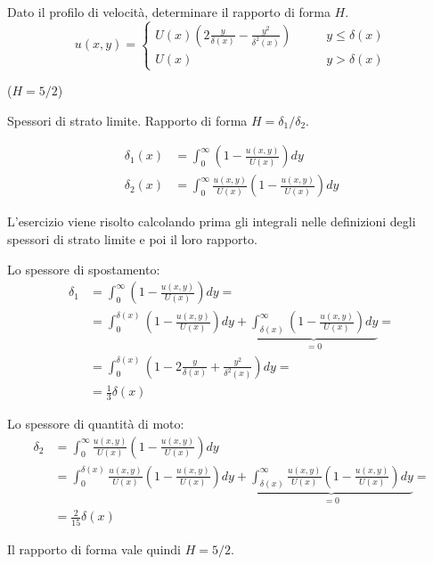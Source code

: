 \noindent
\begin{exerciseS}
Dato il profilo di velocità, determinare il rapporto di forma $H$.
\begin{equation}
  u(x,y) = 
  \begin{cases}
    U(x) \displaystyle\left( 2 \frac{y}{\delta(x)} - \frac{y^2}{\delta^2(x)} \right) &  \qquad y \le \delta(x) \\
    U(x) &  \qquad y > \delta(x)
  \end{cases}
\end{equation}

($H = 5/2$)
\end{exerciseS}

\sol

\partone Spessori di strato limite. Rapporto di forma $H = \delta_1 / \delta_2$.

\begin{equation}
\begin{aligned}
   \delta_1(x) & = \int_{0}^\infty \displaystyle \left( 1 - \frac{u(x,y)}{U(x)} \right) dy \\
   \delta_2(x) & = \int_{0}^\infty \frac{u(x,y)}{U(x)} \displaystyle \left( 1 - \frac{u(x,y)}{U(x)} \right) dy
\end{aligned}
\end{equation}

\parttwo L'esercizio viene risolto calcolando prima gli integrali nelle definizioni degli spessori di strato limite
e poi il loro rapporto.

Lo spessore di spostamento:
\begin{equation}
\begin{aligned}
  \delta_1 & = \int_{0}^\infty \displaystyle \left( 1 - \frac{u(x,y)}{U(x)} \right) dy  = \\
           & = \int_{0}^{\delta(x)} \displaystyle \left( 1 - \frac{u(x,y)}{U(x)} \right) dy +
           \underbrace{\int_{\delta(x)}^\infty \displaystyle \left( 1 - \frac{u(x,y)}{U(x)} \right) dy}_{=0}  =\\
           & = \int_{0}^{\delta(x)} \displaystyle \left( 1 - 2 \frac{y}{\delta(x)} + \frac{y^2}{\delta^2(x)} \right) dy = \\
           & = \frac{1}{3}\delta(x)
\end{aligned}
\end{equation}

Lo spessore di quantità di moto:
\begin{equation}
\begin{aligned}
  \delta_2 & = \int_{0}^\infty \frac{u(x,y)}{U(x)} \displaystyle \left( 1 - \frac{u(x,y)}{U(x)} \right) dy \\
           & = \int_{0}^{\delta(x)} \frac{u(x,y)}{U(x)}\displaystyle \left( 1 - \frac{u(x,y)}{U(x)} \right) dy +
           \underbrace{\int_{\delta(x)}^\infty \frac{u(x,y)}{U(x)}\displaystyle \left( 1 - \frac{u(x,y)}{U(x)} \right) dy}_{=0}  =\\
           & = \frac{2}{15}\delta(x)
\end{aligned}
\end{equation}

Il rapporto di forma vale quindi $H = 5/2 $.



